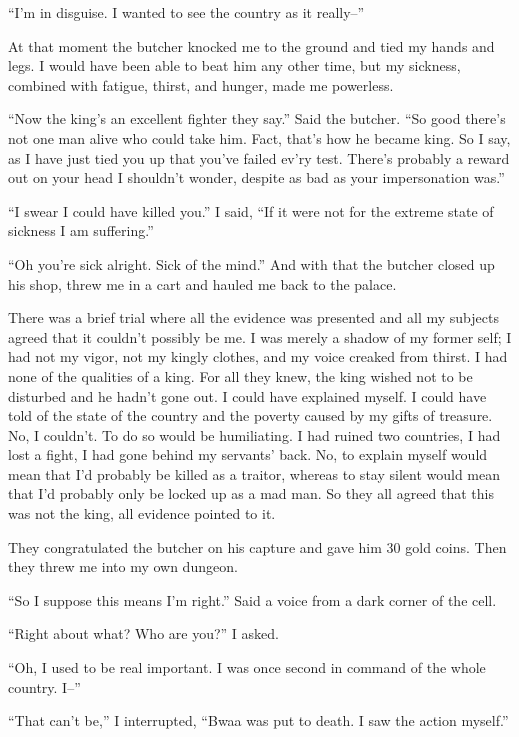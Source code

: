 ``I'm in disguise. I wanted to see the country as it really--''

At that moment the butcher knocked me to the ground and tied my hands and legs. I would have been able to beat him any other time, but my sickness, combined with fatigue, thirst, and hunger, made me powerless.

``Now the king's an excellent fighter they say.'' Said the butcher. ``So good there's not one man alive who could take him. Fact, that's how he became king. So I say, as I have just tied you up that you've failed ev'ry test. There's probably a reward out on your head I shouldn't wonder, despite as bad as your impersonation was.''

``I swear I could have killed you.'' I said, ``If it were not for the extreme state of sickness I am suffering.''

``Oh you're sick alright. Sick of the mind.'' And with that the butcher closed up his shop, threw me in a cart and hauled me back to the palace.

\tbreak

There was a brief trial where all the evidence was presented and all my subjects agreed that it couldn't possibly be me. I was merely a shadow of my former self; I had not my vigor, not my kingly clothes, and my voice creaked from thirst. I had none of the qualities of a king. For all they knew, the king wished not to be disturbed and he hadn't gone out. I could have explained myself. I could have told of the state of the country and the poverty caused by my gifts of treasure. No, I couldn't. To do so would be humiliating. I had ruined two countries, I had lost a fight, I had gone behind my servants' back. No, to explain myself would mean that I'd probably be killed as a traitor, whereas to stay silent would mean that I'd probably only be locked up as a mad man. So they all agreed that this was not the king, all evidence pointed to it.

They congratulated the butcher on his capture and gave him 30 gold coins. Then they threw me into my own dungeon.

``So I suppose this means I'm right.'' Said a voice from a dark corner of the cell.

``Right about what? Who are you?'' I asked.

``Oh, I used to be real important. I was once second in command of the whole country. I--''

``That can't be,'' I interrupted, ``Bwaa was put to death. I saw the action myself.''

